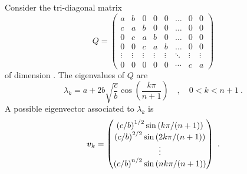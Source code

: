 \begin{prop}
Consider the tri-diagonal matrix
\[
Q = \begin{pmatrix}
a & b & 0 & 0 & 0 & \ldots & 0 & 0 \\
c & a & b & 0 & 0 & \ldots & 0 & 0  \\
0 & c & a & b & 0 & \ldots & 0 & 0 \\
0 & 0 & c & a & b & \ldots & 0 & 0 \\
\vdots & \vdots & \vdots & \vdots & \vdots & \ddots & \vdots & \vdots \\
0 & 0 & 0 & 0 & 0 & \cdots & c & a
\end{pmatrix}
\]
of dimension \nn.  The eigenvalues of $Q$ are
\[
\lambda_k = a + 2 b \sqrt{\frac{c}{b}} \cos\left(\frac{k\pi}{n+1}\right)
\quad , \quad 0 < k < n+1 \ .
\]
A possible eigenvector associated to $\lambda_k$ is
\[
\bm{v}_k =
\begin{pmatrix}
\left(c/b\right)^{1/2} \sin\left(k\pi/(n+1)\right) \\
\left(c/b\right)^{2/2} \sin\left(2k\pi/(n+1)\right) \\
\vdots \\
\left(c/b\right)^{n/2} \sin\left(nk\pi/(n+1)\right)
\end{pmatrix} \ .
\]
\label{fdm_eigR}
\end{prop}

